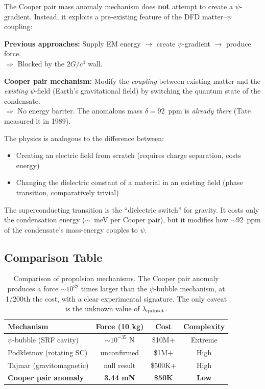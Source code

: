 \documentclass[12pt,a4paper]{article}
\theoremstyle{definition}
\theoremstyle{remark}
\begin{document}
The Cooper pair mass anomaly mechanism does \textbf{not} attempt to create a
$\psi$-gradient.  Instead, it exploits a pre-existing feature of the DFD
matter--$\psi$ coupling:

\begin{tcolorbox}[title={Fundamental Distinction}]
\textbf{Previous approaches:} Supply EM energy $\to$ create $\psi$-gradient
$\to$ produce force.\\
$\Rightarrow$ Blocked by the $2G/c^4$ wall.

\textbf{Cooper pair mechanism:} Modify the \emph{coupling} between existing
matter and the \emph{existing} $\psi$-field (Earth's gravitational field) by
switching the quantum state of the condensate.\\
$\Rightarrow$ No energy barrier.  The anomalous mass $\delta = 92$~ppm is
\emph{already there} (Tate measured it in 1989).
\end{tcolorbox}

The physics is analogous to the difference between:
\begin{itemize}
\item Creating an electric field from scratch (requires charge separation, costs energy)
\item Changing the dielectric constant of a material in an existing field (phase
transition, comparatively trivial)
\end{itemize}

The superconducting transition is the ``dielectric switch'' for gravity.  It
costs only the condensation energy ($\sim$~meV per Cooper pair), but it modifies
how $\sim 92$~ppm of the condensate's mass-energy couples to $\psi$.

\subsection{Comparison Table}

\begin{table}[h]
\centering
\renewcommand{\arraystretch}{1.3}
\begin{tabular}{lccc}
\toprule
\textbf{Mechanism} & \textbf{Force (10 kg)} & \textbf{Cost} & \textbf{Complexity} \\
\midrule
$\psi$-bubble (SRF cavity) & $\sim 10^{-35}$ N & \$10M+ & Extreme \\
Podkletnov (rotating SC) & unconfirmed & \$1M+ & High \\
Tajmar (gravitomagnetic) & null result & \$500K+ & High \\
\textbf{Cooper pair anomaly} & \textbf{3.44 mN} & \textbf{\$50K} & \textbf{Low} \\
\bottomrule
\end{tabular}
\caption{Comparison of propulsion mechanisms.  The Cooper pair anomaly produces
a force $\sim 10^{32}$ times larger than the $\psi$-bubble mechanism, at
1/200th the cost, with a clear experimental signature.  The only caveat is
the unknown value of $\lambda_{\rm quintet}$.}
\label{tab:comparison}
\end{table}
\end{document}
